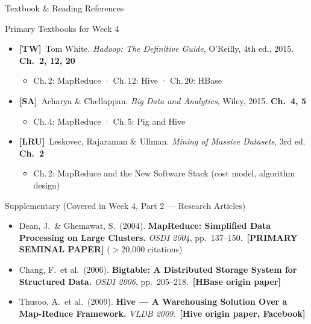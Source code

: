 \documentclass[aspectratio=169,10pt]{beamer}
\begin{document}
\begin{frame}{Textbook \& Reading References}
  \begin{block}{Primary Textbooks for Week 4}
    \begin{itemize}
      \item \textbf{[TW]}\ Tom White. \textit{Hadoop: The Definitive Guide}, O'Reilly, 4th ed., 2015.
            \hfill \textbf{Ch.\ 2, 12, 20}
            \begin{itemize}
              \small\item Ch.\,2: MapReduce · Ch.\,12: Hive · Ch.\,20: HBase
            \end{itemize}
      \item \textbf{[SA]}\ Acharya \& Chellappan. \textit{Big Data and Analytics}, Wiley, 2015.
            \hfill \textbf{Ch.\ 4, 5}
            \begin{itemize}
              \small\item Ch.\,4: MapReduce · Ch.\,5: Pig and Hive
            \end{itemize}
      \item \textbf{[LRU]}\ Leskovec, Rajaraman \& Ullman. \textit{Mining of Massive Datasets}, 3rd ed.
            \hfill \textbf{Ch.\ 2}
            \begin{itemize}
              \small\item Ch.\,2: MapReduce and the New Software Stack (cost model, algorithm design)
            \end{itemize}
    \end{itemize}
  \end{block}
  \vspace{6pt}
  \begin{exampleblock}{Supplementary (Covered in Week 4, Part 2 — Research Articles)}
    \begin{itemize}
      \small
      \item Dean, J.\ \& Ghemawat, S.\ (2004). \textbf{MapReduce: Simplified Data Processing on Large Clusters.}
            \textit{OSDI 2004}, pp.\ 137--150.\ \textbf{[PRIMARY SEMINAL PAPER]} ($>$20{,}000 citations)
      \item Chang, F.\ et al.\ (2006). \textbf{Bigtable: A Distributed Storage System for Structured Data.}
            \textit{OSDI 2006}, pp.\ 205--218.\ \textbf{[HBase origin paper]}
      \item Thusoo, A.\ et al.\ (2009). \textbf{Hive — A Warehousing Solution Over a Map-Reduce Framework.}
            \textit{VLDB 2009}.\ \textbf{[Hive origin paper, Facebook]}
    \end{itemize}
  \end{exampleblock}
\end{frame}
\end{document}
